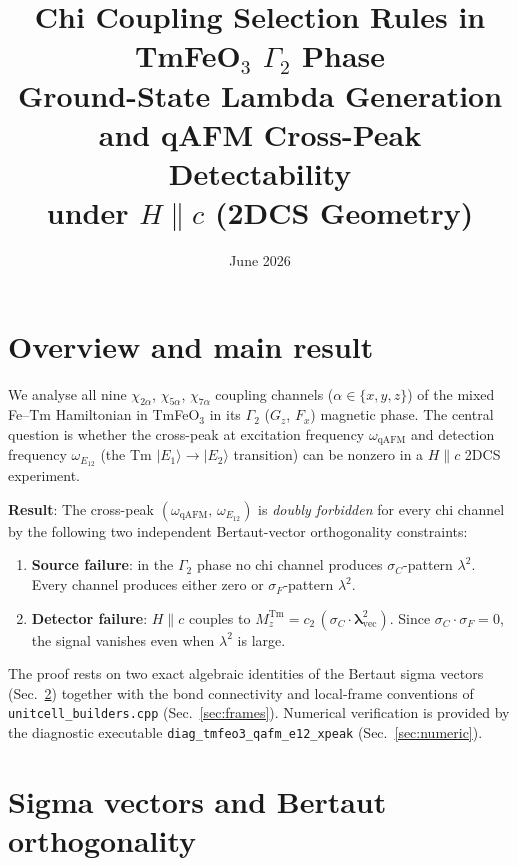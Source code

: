 \documentclass[11pt,a4paper]{article}
\title{\textbf{Chi Coupling Selection Rules in TmFeO$_3$ $\Gamma_2$ Phase}\\[4pt]
\large Ground-State Lambda Generation and qAFM Cross-Peak Detectability\\
under $H\parallel c$ (2DCS Geometry)}
\author{}
\date{June 2026}
\newcommand{\sF}{\sigma_F}
\newcommand{\sC}{\sigma_C}
\newcommand{\vlam}{\bm{\lambda}}
\newcommand{\Mz}{M_z^{\mathrm{Tm}}}
\newcommand{\lamt}{\lambda^2}
\newcommand{\FeOs}{TmFeO$_3$}
\newcommand{\Gtwo}{\Gamma_2}
\newcommand{\qAFM}{\mathrm{qAFM}}
\newcommand{\EtA}{E_{12}}
\newcommand{\crossP}{(\omega_{\qAFM},\,\omega_{\EtA})}
\begin{document}
\maketitle
\tableofcontents
\bigskip\bigskip

\section{Overview and main result}

We analyse all nine $\chi_{2\alpha}$, $\chi_{5\alpha}$, $\chi_{7\alpha}$
coupling channels ($\alpha \in \{x,y,z\}$) of the mixed Fe--Tm Hamiltonian
in \FeOs{} in its $\Gtwo$ ($G_z$, $F_x$) magnetic phase.  The central
question is whether the cross-peak at excitation frequency $\omega_{\qAFM}$
and detection frequency $\omega_{\EtA}$ (the Tm $|E_1\rangle\!\to\!|E_2\rangle$
transition) can be nonzero in a $H\parallel c$ 2DCS experiment.

\medskip
\noindent\colorbox{lightred}{%
\parbox{\dimexpr\linewidth-2\fboxsep}{%
\textbf{Result}: The cross-peak $\crossP$ is \emph{doubly forbidden} for
every chi channel by the following two independent Bertaut-vector orthogonality
constraints:
\begin{enumerate}
  \item \textbf{Source failure}: in the $\Gtwo$ phase no chi channel produces
    $\sC$-pattern $\lamt$.  Every channel produces either zero or
    $\sF$-pattern $\lamt$.
  \item \textbf{Detector failure}: $H\parallel c$ couples to
    $\Mz = c_2\,(\sC \cdot \vlam^2_{\mathrm{vec}})$.
    Since $\sC\cdot\sF = 0$, the signal vanishes even when $\lamt$ is large.
\end{enumerate}
}}

\medskip
The proof rests on two exact algebraic identities of the Bertaut sigma vectors
(Sec.~\ref{sec:sigma}) together with the bond connectivity and local-frame
conventions of \texttt{unitcell\_builders.cpp} (Sec.~\ref{sec:frames}).
Numerical verification is provided by the diagnostic executable
\texttt{diag\_tmfeo3\_qafm\_e12\_xpeak} (Sec.~\ref{sec:numeric}).

\section{Sigma vectors and Bertaut orthogonality}
\label{sec:sigma}
\end{document}
